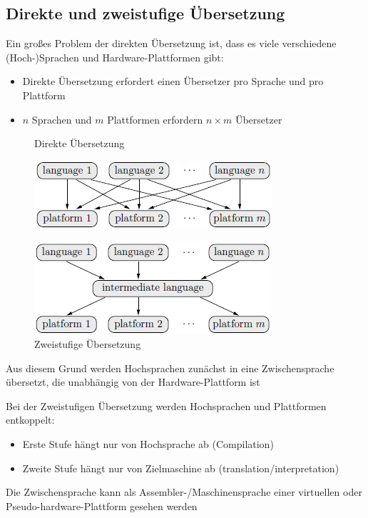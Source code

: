 \documentclass[12pt]{report}
\begin{document}
\subsection{Direkte und zweistufige Übersetzung}
Ein großes Problem der direkten Übersetzung ist, dass es viele verschiedene (Hoch-)Sprachen und Hardware-Plattformen gibt:
\begin{itemize}
  \item Direkte Übersetzung erfordert einen Übersetzer pro Sprache und pro Plattform
  \item $n$ Sprachen und $m$ Plattformen erfordern $n \times m$ Übersetzer
\end{itemize}

\begin{figure}[H]
  \begin{minipage}[t]{0.45\textwidth}
    \caption{Direkte Übersetzung}
    \label{fig:compiler_direkt}
    \centering
    \includegraphics[width=\textwidth]{compiler_direkt}
  \end{minipage}
  \hfill
  \begin{minipage}[t]{0.45\textwidth}
    \caption{Zweistufige Übersetzung}
    \label{fig:compiler_zweistufig}
    \centering
    \includegraphics[width=\textwidth]{compiler_zweistufig}
  \end{minipage}
\end{figure}

Aus diesem Grund werden Hochsprachen zunächst in eine Zwischensprache übersetzt, die unabhängig von der Hardware-Plattform ist

\begin{defbox}
  Bei der Zweistufigen Übersetzung werden Hochsprachen und Plattformen entkoppelt:
  \begin{itemize}
    \item Erste Stufe hängt nur von Hochsprache ab (Compilation)
    \item Zweite Stufe hängt nur von Zielmaschine ab (translation/interpretation)
  \end{itemize}
  
  Die Zwischensprache kann als Assembler-/Maschinensprache einer virtuellen oder Pseudo-hardware-Plattform gesehen werden
\end{defbox}
\end{document}
